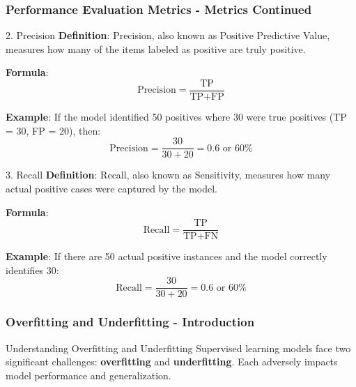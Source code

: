 \documentclass[aspectratio=169]{beamer}
\begin{document}
\begin{frame}[fragile]
    \frametitle{Performance Evaluation Metrics - Metrics Continued}
    \begin{block}{2. Precision}
        \textbf{Definition}: Precision, also known as Positive Predictive Value, measures how many of the items labeled as positive are truly positive.
        
        \textbf{Formula}:
        \begin{equation}
            \text{Precision} = \frac{\text{TP}}{\text{TP} + \text{FP}}
        \end{equation}

        \textbf{Example}: If the model identified 50 positives where 30 were true positives (TP = 30, FP = 20), then:
        \begin{equation}
            \text{Precision} = \frac{30}{30 + 20} = 0.6 \text{ or } 60\%
        \end{equation}
    \end{block}
    
    \begin{block}{3. Recall}
        \textbf{Definition}: Recall, also known as Sensitivity, measures how many actual positive cases were captured by the model.
        
        \textbf{Formula}:
        \begin{equation}
            \text{Recall} = \frac{\text{TP}}{\text{TP} + \text{FN}}
        \end{equation}

        \textbf{Example}: If there are 50 actual positive instances and the model correctly identifies 30:
        \begin{equation}
            \text{Recall} = \frac{30}{30 + 20} = 0.6 \text{ or } 60\%
        \end{equation}
    \end{block}
\end{frame}

\begin{frame}[fragile]
    \frametitle{Overfitting and Underfitting - Introduction}
    \begin{block}{Understanding Overfitting and Underfitting}
        Supervised learning models face two significant challenges: 
        \textbf{overfitting} and \textbf{underfitting}. 
        Each adversely impacts model performance and generalization.
    \end{block}
\end{frame}
\end{document}
